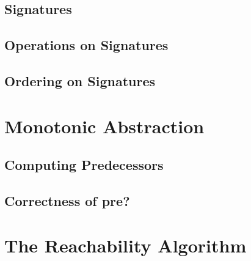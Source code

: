 \subsection{Signatures}

\subsection{Operations on Signatures}

\subsection{Ordering on Signatures}

\section{Monotonic Abstraction}

\subsection{Computing Predecessors}

\subsection{Correctness of pre?}

\section{The Reachability Algorithm}



